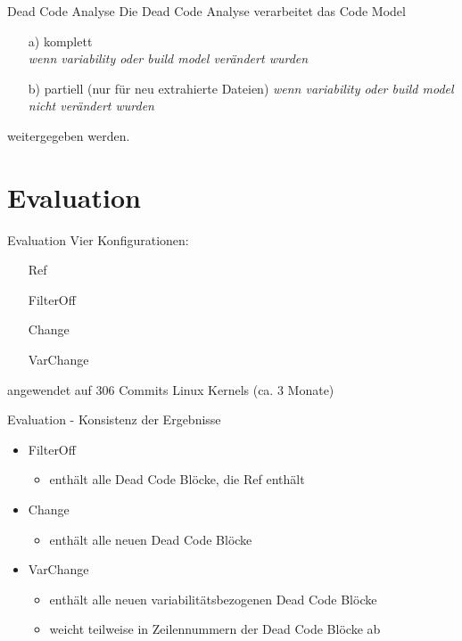 \documentclass[aspectratio=43, noserifmath]{beamer}
\begin{document}
\begin{frame}{Dead Code Analyse}
Die Dead Code Analyse verarbeitet das Code Model 
\begin{itemize}
    \item[a)] komplett \\
    \emph{wenn variability oder build model \alert{ver\"andert} wurden}
    \item[b)] partiell (nur f\"ur neu extrahierte Dateien)
    \emph{wenn variability oder build model \alert{nicht ver\"andert} wurden}
\end{itemize}
weitergegeben werden.
\end{frame}

\section{Evaluation}

\begin{frame}{Evaluation}
Vier Konfigurationen:
\begin{itemize}
    \item[\textbullet] Ref
    \item[\textbullet] FilterOff
    \item[\textbullet] Change
    \item[\textbullet] VarChange
\end{itemize}
angewendet auf 306 Commits Linux Kernels (ca. 3 Monate)
\end{frame}


\begin{frame}{Evaluation - Konsistenz der Ergebnisse}

\begin{itemize}
    \item FilterOff\\
    \begin{itemize}
        \item enth\"alt \alert{alle} Dead Code Bl\"ocke, die Ref enth\"alt
    \end{itemize}
    \item Change \\
    \begin{itemize}
        \item enth\"alt \alert{alle neuen} Dead Code Bl\"ocke
    \end{itemize}
    \item VarChange\\
    \begin{itemize}
        \item enth\"alt \alert{alle neuen variabilit\"atsbezogenen} Dead Code Bl\"ocke
        \item weicht teilweise in Zeilennummern der Dead Code Bl\"ocke ab
    \end{itemize}
\end{itemize}    
\end{frame}
\end{document}
